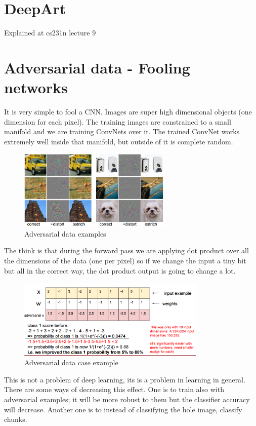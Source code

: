 \section{DeepArt}
Explained at cs231n lecture 9

\section{Adversarial data - Fooling networks}
It is very simple to fool a CNN. Images are super high dimensional objects (one dimension for each pixel). The training images are constrained to a small manifold and we are training ConvNets over it. The trained ConvNet works extremely well inside that manifold, but outside of it is complete random.

\begin{figure}[h]
  \centering
  \includegraphics[width=0.65\textwidth]{Images/visualization/14.png}
  \caption{Adversarial data examples}
\end{figure}

The think is that during the forward pass we are applying dot product over all the dimensions of the data (one per pixel) so if we change the input a tiny bit but all in the correct way, the dot product output is going to change a lot.

\begin{figure}[h]
  \centering
  \includegraphics[width=0.8\textwidth]{Images/visualization/15.png}
  \caption{Adversarial data case example}
\end{figure}

This is not a problem of deep learning, its is a problem in learning in general. There are some ways of decreasing this effect. One is to train also with adversarial examples; it will be more robust to them but the classifier accuracy will decrease. Another one is to instead of classifying the hole image, classify chunks.